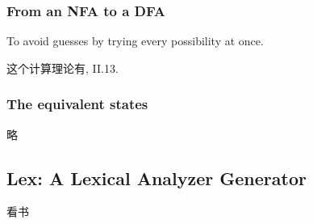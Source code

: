 \subsubsection{From an NFA to a DFA}
To avoid guesses by trying every possibility at once.

这个计算理论有, II.13.

\subsubsection{The equivalent states}
略
\subsection{Lex: A Lexical Analyzer Generator}
看书